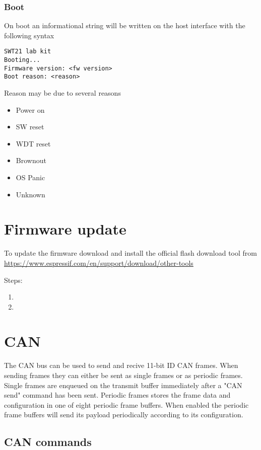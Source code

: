 \documentclass{article}[a4paper]
\begin{document}
\subsubsection{Boot}
On boot an informational string will be written on the host interface with
the following syntax

\begin{verbatim}
SWT21 lab kit
Booting...
Firmware version: <fw version>
Boot reason: <reason>
\end{verbatim}

Reason may be due to several reasons
\begin{itemize}
\item Power on
\item SW reset
\item WDT reset
\item Brownout
\item OS Panic
\item Unknown
\end{itemize}

\section{Firmware update}
To update the firmware download and install the official flash download tool from
\url{https://www.espressif.com/en/support/download/other-tools}

Steps:
\begin{enumerate}
\item
\item
\end{enumerate}

\section{CAN}
The CAN bus can be used to send and recive 11-bit ID CAN frames.
When sending frames they can either be sent as single frames or as periodic
frames. Single frames are enqueued on the transmit buffer immediately after a
"CAN send" command has been sent. Periodic frames stores the frame data and
configuration in one
of eight periodic frame buffers. When enabled the periodic frame buffers will
send its payload periodically according to its configuration.


\subsection{CAN commands}
\end{document}
